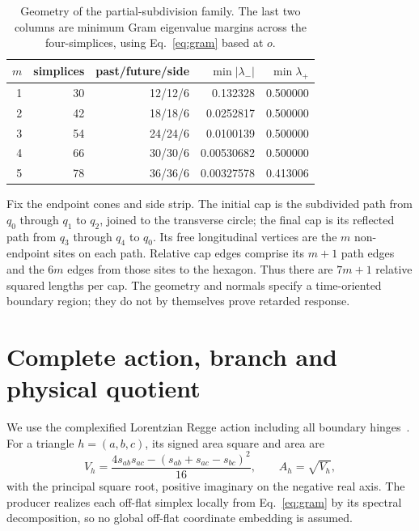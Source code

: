 \documentclass[11pt]{article}
\theoremstyle{remark}\newtheorem{remark}[theorem]{Remark}
\begin{document}
\begin{table}[htbp]
\centering\small
\caption{Geometry of the partial-subdivision family. The last two columns are minimum Gram eigenvalue margins across the four-simplices, using Eq.~\eqref{eq:gram} based at $o$.}
\label{tab:geometry}
\begin{tabular}{rrrrr}
\toprule
$m$&simplices&past/future/side&$\min|\lambda_-|$&$\min\lambda_+$\\
\midrule
1&30&12/12/6&0.132328&0.500000\\
2&42&18/18/6&0.0252817&0.500000\\
3&54&24/24/6&0.0100139&0.500000\\
4&66&30/30/6&0.00530682&0.500000\\
5&78&36/36/6&0.00327578&0.413006\\
\bottomrule
\end{tabular}
\end{table}

Fix the endpoint cones and side strip.
The initial cap is the subdivided path from $q_0$ through $q_1$ to $q_2$, joined to the transverse circle; the final cap is its reflected path from $q_3$ through $q_4$ to $q_0$.
Its free longitudinal vertices are the $m$ non-endpoint sites on each path.
Relative cap edges comprise its $m+1$ path edges and the $6m$ edges from those sites to the hexagon.
Thus there are $7m+1$ relative squared lengths per cap.
The geometry and normals specify a time-oriented boundary region; they do not by themselves prove retarded response.

\section{Complete action, branch and physical quotient}
\label{sec:action}
We use the complexified Lorentzian Regge action including all boundary hinges~\cite{BorissovaDittrich2023}.
For a triangle $h=(a,b,c)$, its signed area square and area are
\begin{equation}
V_h=\frac{4s_{ab}s_{ac}-(s_{ab}+s_{ac}-s_{bc})^2}{16},
\qquad A_h=\sqrt{V_h},
\label{eq:area}
\end{equation}
with the principal square root, positive imaginary on the negative real axis.
The producer realizes each off-flat simplex locally from Eq.~\eqref{eq:gram} by its spectral decomposition, so no global off-flat coordinate embedding is assumed.
\end{document}
